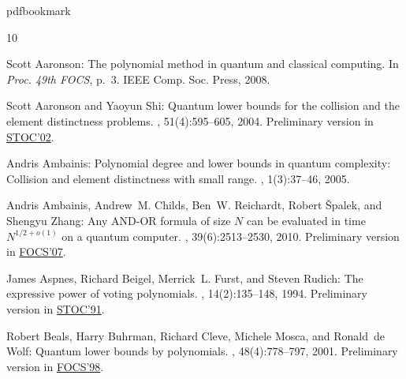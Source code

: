 %
%
%
%
%
\providecommand{\bibhead}[1]{}
%
\expandafter\ifx\csname pdfbookmark\endcsname\relax%
  \providecommand{\tocrefpdfbookmark}{}
\else\providecommand{\tocrefpdfbookmark}{%
   \hypertarget{tocreferences}{}%
   \pdfbookmark[1]{References}{tocreferences}}%
\fi

\tocrefpdfbookmark
\begin{thebibliography}{10}

\bibhead{aaronson08tutorial}
{\sc Scott Aaronson}: The polynomial method in quantum and classical computing.
\newblock In {\em Proc. 49th FOCS}, p.~3. IEEE Comp. Soc. Press, 2008.

\bibhead{aaronson-shi04distinctness}
{\sc Scott Aaronson and Yaoyun Shi}: Quantum lower bounds for the collision and
  the element distinctness problems.
, 51(4):595--605, 2004.
\newblock Preliminary version in
  \href{http://dx.doi.org/10.1145/509907.509999}{STOC'02}.
\newblock [\epfmtdoi{10.1145/1008731.1008735}]

\bibhead{ambainis05collision}
{\sc Andris Ambainis}: Polynomial degree and lower bounds in quantum
  complexity: {C}ollision and element distinctness with small range.
, 1(3):37--46, 2005.

\bibhead{ACRSZ07nand}
{\sc Andris Ambainis, Andrew~M. Childs, Ben~W. Reichardt, Robert {\v S}palek,
  and Shengyu Zhang}: Any {AND-OR} formula of size {$N$} can be evaluated in
  time {$N^{1/2+o(1)}$} on a quantum computer.
, 39(6):2513--2530, 2010.
\newblock Preliminary version in
  \href{http://dx.doi.org/10.1109/FOCS.2007.57}{FOCS'07}.
\newblock [\epfmtdoi{10.1137/080712167}]

\bibhead{aspnes91voting}
{\sc James Aspnes, Richard Beigel, Merrick~L. Furst, and Steven Rudich}: The
  expressive power of voting polynomials.
, 14(2):135--148, 1994.
\newblock Preliminary version in
  \href{http://dx.doi.org/10.1145/103418.103461}{STOC'91}.
\newblock [\epfmtdoi{10.1007/BF01215346}]

\bibhead{beals-et-al01quantum-by-polynomials}
{\sc Robert Beals, Harry Buhrman, Richard Cleve, Michele Mosca, and Ronald~de
  Wolf}: Quantum lower bounds by polynomials.
, 48(4):778--797, 2001.
\newblock Preliminary version in
  \href{http://dx.doi.org/10.1109/SFCS.1998.743485}{FOCS'98}.
\newblock [\epfmtdoi{10.1145/502090.502097}]


\end{thebibliography}
